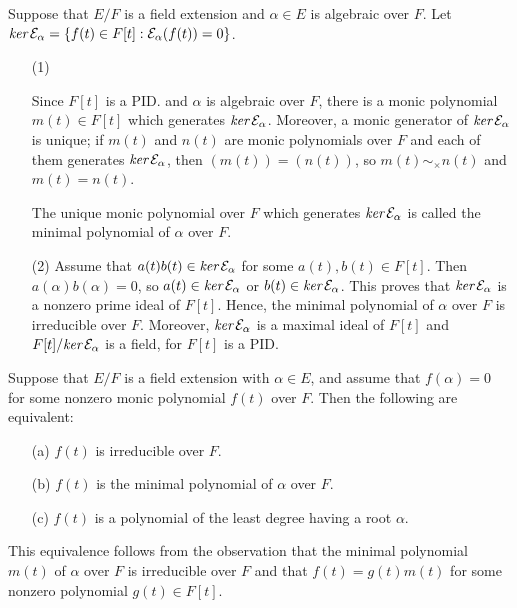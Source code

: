\begin{obs}\label{min.poly}
    Suppose that $E/F$ is a field extension and $\alpha\in E$ is algebraic over $F$.
    Let $\textit{ker\,}{\mathcal{E}}_\alpha=\{f(t)\in F[t]: {\mathcal{E}}_\alpha(f(t))=0\}$.
    \begin{enumerate}
        \item[(1)]
        {
            Since $F[t]$ is a PID. and $\alpha$ is algebraic over $F$, there is a monic polynomial $m(t)\in F[t]$ which generates $\textit{ker\,}{\mathcal{E}}_\alpha$.
            Moreover, a monic generator of $\textit{ker\,}{\mathcal{E}}_\alpha$ is unique; if $m(t)$ and $n(t)$ are monic polynomials over $F$ and each of them generates $\textit{ker\,}{\mathcal{E}}_\alpha$, then $(m(t))=(n(t))$, so $m(t)\sim_\times n(t)$ and $m(t)=n(t)$.
            \begin{defi}
                The unique monic polynomial over $F$ which generates $\textit{ker\,}{\mathcal{E}}_\alpha$ is called the minimal polynomial of $\alpha$ over $F$.
            \end{defi}
        }
        \item[(2)]
        {
            Assume that $a(t)b(t)\in \textit{ker\,}{\mathcal{E}}_\alpha$ for some $a(t), b(t)\in F[t]$.
            Then $a(\alpha)b(\alpha)=0$, so $a(t)\in \textit{ker\,}{\mathcal{E}}_\alpha$ or $b(t)\in \textit{ker\,}{\mathcal{E}}_\alpha$.
            This proves that $\textit{ker\,}{\mathcal{E}}_\alpha$ is a nonzero prime ideal of $F[t]$.
            Hence, the minimal polynomial of $\alpha$ over $F$ is irreducible over $F$.
            Moreover, $\textit{ker\,}{\mathcal{E}}_\alpha$ is a maximal ideal of $F[t]$ and $F[t]/\textit{ker\,}{\mathcal{E}}_\alpha$ is a field, for $F[t]$ is a PID.
        }
    \end{enumerate}

    Suppose that $E/F$ is a field extension with $\alpha\in E$, and assume that $f(\alpha)=0$ for some nonzero monic polynomial $f(t)$ over $F$.
    Then the following are equivalent:
    \begin{enumerate}
        \item[(a)]
        {
            $f(t)$ is irreducible over $F$.
        }
        \item[(b)]
        {
            $f(t)$ is the minimal polynomial of $\alpha$ over $F$.
        }
        \item[(c)]
        {
            $f(t)$ is a polynomial of the least degree having a root $\alpha$.
        }
    \end{enumerate}
    This equivalence follows from the observation that the minimal polynomial $m(t)$ of $\alpha$ over $F$ is irreducible over $F$ and that $f(t)=g(t)m(t)$ for some nonzero polynomial $g(t)\in F[t]$.
\end{obs}
